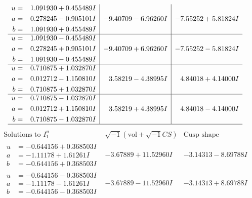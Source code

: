 \documentclass[1p]{elsarticle_modified}
\theoremstyle{definition}
\newcommand{\I}{\sqrt{-1}}
\begin{document}
$$\begin{array}{c|c|c}
\begin{aligned}
u &= \phantom{-}1.091930 + 0.455489 I \\
a &= \phantom{-}0.278245 - 0.905101 I \\
b &= \phantom{-}1.091930 + 0.455489 I\end{aligned}
 & -9.40709 - 6.96260 I & -7.55252 + 5.81824 I \\ \hline\begin{aligned}
u &= \phantom{-}1.091930 - 0.455489 I \\
a &= \phantom{-}0.278245 + 0.905101 I \\
b &= \phantom{-}1.091930 - 0.455489 I\end{aligned}
 & -9.40709 + 6.96260 I & -7.55252 - 5.81824 I \\ \hline\begin{aligned}
u &= \phantom{-}0.710875 + 1.032870 I \\
a &= \phantom{-}0.012712 - 1.150810 I \\
b &= \phantom{-}0.710875 + 1.032870 I\end{aligned}
 & \phantom{-}3.58219 - 4.38995 I & \phantom{-}4.84018 + 4.14000 I \\ \hline\begin{aligned}
u &= \phantom{-}0.710875 - 1.032870 I \\
a &= \phantom{-}0.012712 + 1.150810 I \\
b &= \phantom{-}0.710875 - 1.032870 I\end{aligned}
 & \phantom{-}3.58219 + 4.38995 I & \phantom{-}4.84018 - 4.14000 I\\
 \hline 
 \end{array}$$\newpage$$\begin{array}{c|c|c}  
\text{Solutions to }I^u_{1}& \I (\text{vol} + \sqrt{-1}CS) & \text{Cusp shape}\\
 \hline 
\begin{aligned}
u &= -0.644156 + 0.368503 I \\
a &= -1.11178 + 1.61261 I \\
b &= -0.644156 + 0.368503 I\end{aligned}
 & -3.67889 + 11.52960 I & -3.14313 - 8.69788 I \\ \hline\begin{aligned}
u &= -0.644156 - 0.368503 I \\
a &= -1.11178 - 1.61261 I \\
b &= -0.644156 - 0.368503 I\end{aligned}
 & -3.67889 - 11.52960 I & -3.14313 + 8.69788 I \\ \hline\begin{aligned}

\end{aligned}
\end{array}$$
\end{document}
